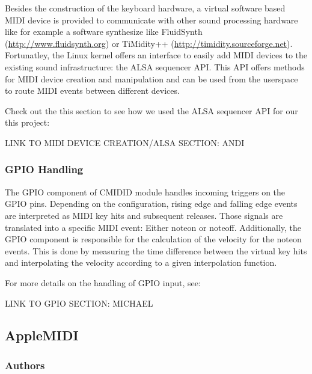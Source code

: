 \documentclass{sig-alternate}
\begin{document}
Besides the construction of the keyboard hardware, a virtual software based 
MIDI device is provided to communicate with other sound processing hardware 
like for example a software synthesize like FluidSynth 
(\url{http://www.fluidsynth.org}) or TiMidity++ 
(\url{http://timidity.sourceforge.net}). Fortunatley, the Linux kernel 
offers an interface to easily add MIDI devices to the existing sound 
infrastructure: the ALSA sequencer API. This API offers methods for MIDI 
device creation and manipulation and can be used from the userspace to 
route MIDI events between different devices.

Check out the this section to see how we used the ALSA sequencer API for
our this project:

LINK TO MIDI DEVICE CREATION/ALSA SECTION: ANDI

\subsubsection{GPIO Handling}
\label{cmidid:gpio}

The GPIO component of CMIDID module handles incoming triggers on the GPIO 
pins. Depending on the configuration, rising edge and falling edge events 
are interpreted as MIDI key hits and subsequent releases. Those signals are 
translated into a specific MIDI event: Either noteon or noteoff. Additionally, 
the GPIO component is responsible for the calculation of the velocity for 
the noteon events. This is done by measuring the time difference between 
the virtual key hits and interpolating the velocity according to a given 
interpolation function.

For more details on the handling of GPIO input, see:

LINK TO GPIO SECTION: MICHAEL

\subsection{AppleMIDI}
\label{overview:applemidi}



\subsubsection{Authors}
\label{applemidi:authors}
\end{document}

